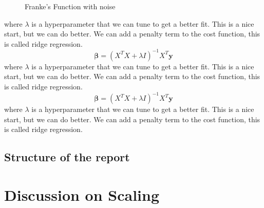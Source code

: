 \documentclass[twoside,11pt]{report}
\begin{document}
\begin{figure}
\begin{center}
    \begin{adjustbox}{clip,trim=4cm 3.4cm 3cm 4.8cm, max width=0.3\textwidth}
    
    \end{adjustbox}
    \caption{\small Franke's Function with noise}
    \label{frankfuncnoise}
    \end{center}
\end{figure}



where $\lambda$ is a hyperparameter that we can tune to get a better fit. This is a nice start, but we can do better. We can add a penalty term to the cost function, this is called ridge regression.
\begin{equation}
    \boldsymbol{\beta} = (X^T X + \lambda I)^{-1} X^T \boldsymbol{y}
\end{equation}
where $\lambda$ is a hyperparameter that we can tune to get a better fit. This is a nice start, but we can do better. We can add a penalty term to the cost function, this is called ridge regression.
\begin{equation}
    \boldsymbol{\beta} = (X^T X + \lambda I)^{-1} X^T \boldsymbol{y}
\end{equation}
where $\lambda$ is a hyperparameter that we can tune to get a better fit. This is a nice start, but we can do better. We can add a penalty term to the cost function, this is called ridge regression.


\subsection{Structure of the report}



\section{Discussion on Scaling}


\begin{table}[!h]
\caption{Unscaled sample design matrix fitting one-dimensional polynomial of degree 5}
\tt
\centering
{}
\end{table}
\end{document}
